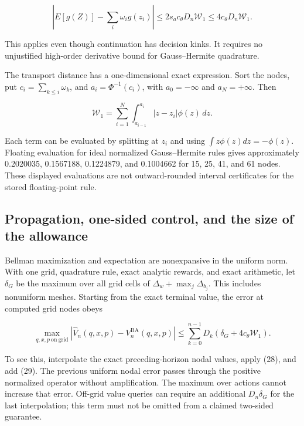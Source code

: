 \documentclass[10pt,a4paper]{article}
\begin{document}
\begin{equation}
\left|E[g(Z)]-\sum_i\omega_i g(z_i)\right|
\le 2s_ac_\theta D_n\mathcal W_1
\le 4c_\theta D_n\mathcal W_1.
\tag{29}
\end{equation}

This applies even though continuation has decision kinks. It requires no
unjustified high-order derivative bound for Gauss--Hermite quadrature.

The transport distance has a one-dimensional exact expression. Sort the nodes,
put $c_i=\sum_{k\le i}\omega_k$, and
$a_i=\Phi^{-1}(c_i)$, with $a_0=-\infty$ and $a_N=+\infty$. Then

\begin{equation}
\mathcal W_1=\sum_{i=1}^N
\int_{a_{i-1}}^{a_i}|z-z_i|\phi(z)\,dz.
\tag{30}
\end{equation}

Each term can be evaluated by splitting at $z_i$ and using
$\int z\phi(z)dz=-\phi(z)$. Floating evaluation for ideal normalized
Gauss--Hermite rules gives approximately 0.2020035, 0.1567188, 0.1224879, and
0.1004662 for 15, 25, 41, and 61 nodes. These displayed evaluations are not
outward-rounded interval certificates for the stored floating-point rule.

\subsection{Propagation, one-sided control, and the size of the allowance}

Bellman maximization and expectation are nonexpansive in the uniform norm.
With one grid, quadrature rule, exact analytic rewards, and exact arithmetic,
let $\delta_G$ be the maximum over all grid cells of $\Delta_w+\max_j\Delta_{b_j}$. This includes nonuniform meshes. Starting from the exact terminal
value, the error at computed grid nodes obeys

\begin{equation}
\max_{q,x,p\ \mathrm{on\ grid}}
|\widehat V_n(q,x,p)-V_n^{\mathrm{BA}}(q,x,p)|
\le\sum_{k=0}^{n-1}D_k(\delta_G+4c_\theta\mathcal W_1).
\tag{31}
\end{equation}

To see this, interpolate the exact preceding-horizon nodal values, apply (28),
and add (29). The previous uniform nodal error passes through the positive
normalized operator without amplification. The maximum over actions cannot
increase that error. Off-grid value queries can require an additional
$D_n\delta_G$ for the last interpolation; this term must not be omitted
from a claimed two-sided guarantee.
\end{document}
